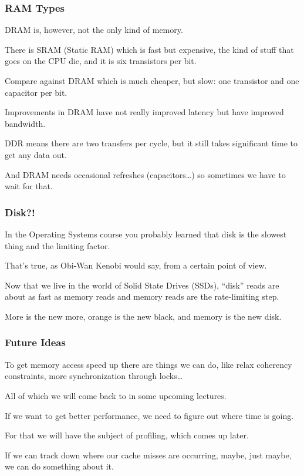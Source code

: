 \begin{frame}
\frametitle{RAM Types}

DRAM is, however, not the only kind of memory. 

There is SRAM (Static RAM) which is fast but expensive, the kind of stuff that goes on the CPU die, and it is six transistors per bit. 

Compare against DRAM which is much cheaper, but slow: one transistor and one capacitor per bit. 

Improvements in DRAM have not really improved latency but have improved bandwidth. 

DDR means there are two transfers per cycle, but it still takes significant time to get any data out. 

And DRAM needs occasional refreshes (capacitors\ldots) so sometimes we have to wait for that.

\end{frame}



\begin{frame}
\frametitle{Disk?!}

In the Operating Systems course you probably learned that disk is the slowest thing and the limiting factor. 

That's true, as Obi-Wan Kenobi would say, from a certain point of view. 

Now that we live in the world of Solid State Drives (SSDs), ``disk'' reads are about as fast as memory reads and memory reads are the rate-limiting step. 

More is the new more, orange is the new black, and memory is the new disk.

\end{frame}



\begin{frame}
\frametitle{Future Ideas}

To get memory access speed up there are things we can do, like relax coherency constraints, more synchronization through locks\ldots 

All of which we will come back to in some upcoming lectures. 

If we want to get better performance, we need to figure out where time is going. 

For that we will have the subject of profiling, which comes up later.

If we can track down where our cache misses are occurring, maybe, just maybe, we can do something about it. 


\end{frame}



